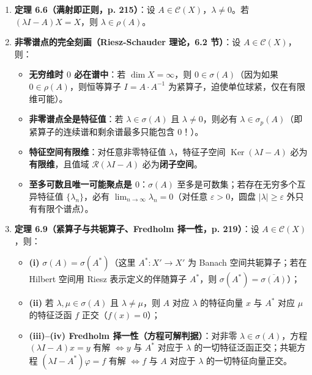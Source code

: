 \documentclass[11pt,a4paper]{article}
\providecommand{\tightlist}{\setlength{\itemsep}{2pt}\setlength{\parskip}{0pt}}
\begin{document}
\begin{enumerate}
\def\labelenumi{\arabic{enumi}.}
\tightlist
\item
  \textbf{定理 6.6（满射即正则，p. 215）}：设 \(A \in \mathcal{C}(X)\)，\(\lambda \neq 0\)。若 \((\lambda I - A)X = X\)，则 \(\lambda \in \rho(A)\)。
\item
  \textbf{非零谱点的完全刻画（Riesz-Schauder 理论，6.2 节）}：设 \(A \in \mathcal{C}(X)\)，则：

  \begin{itemize}
  \tightlist
  \item
    \textbf{无穷维时 \(0\) 必在谱中}：若 \(\dim X = \infty\)，则 \(0 \in \sigma(A)\)（因为如果 \(0 \in \rho(A)\)，则恒等算子 \(I = A \cdot A^{-1}\) 为紧算子，迫使单位球紧，仅在有限维可能）。
  \item
    \textbf{非零谱点全是特征值}：若 \(\lambda \in \sigma(A)\) 且 \(\lambda \neq 0\)，则必有 \(\lambda \in \sigma_p(A)\)（即紧算子的连续谱和剩余谱最多只能包含 \(0\)！）。
  \item
    \textbf{特征空间有限维}：对任意非零特征值 \(\lambda\)，特征子空间 \(\operatorname{Ker}(\lambda I - A)\) 必为\textbf{有限维}，且值域 \(\mathcal{R}(\lambda I - A)\) 必为\textbf{闭子空间}。
  \item
    \textbf{至多可数且唯一可能聚点是 \(0\)}：\(\sigma(A)\) 至多是可数集；若存在无穷多个互异特征值 \(\{\lambda_n\}\)，必有 \(\lim_{n\to\infty} \lambda_n = 0\)（对任意 \(\varepsilon > 0\)，圆盘 \(|\lambda| \ge \varepsilon\) 外只有有限个谱点）。
  \end{itemize}
\item
  \textbf{定理 6.9（紧算子与共轭算子、Fredholm 择一性，p. 219）}：设 \(A \in \mathcal{C}(X)\)，则：

  \begin{itemize}
  \tightlist
  \item
    \textbf{(i)} \(\sigma(A) = \sigma(A^*)\)（这里 \(A^* : X' \to X'\) 为 Banach 空间共轭算子；若在 Hilbert 空间用 Riesz 表示定义的伴随算子 \(A^*\)，则 \(\sigma(A^*) = \overline{\sigma(A)}\)）；
  \item
    \textbf{(ii)} 若 \(\lambda, \mu \in \sigma(A)\) 且 \(\lambda \neq \mu\)，则 \(A\) 对应 \(\lambda\) 的特征向量 \(x\) 与 \(A^*\) 对应 \(\mu\) 的特征泛函 \(f\) 正交（\(f(x) = 0\)）；
  \item
    \textbf{(iii)--(iv) Fredholm 择一性（方程可解判据）}：对非零 \(\lambda \in \sigma(A)\)，方程 \((\lambda I - A)x = y\) 有解 \(\iff y\) 与 \(A^*\) 对应于 \(\lambda\) 的一切特征泛函正交；共轭方程 \((\lambda I - A^*)\varphi = f\) 有解 \(\iff f\) 与 \(A\) 对应于 \(\lambda\) 的一切特征向量正交。
  \end{itemize}
\end{enumerate}
\end{document}
